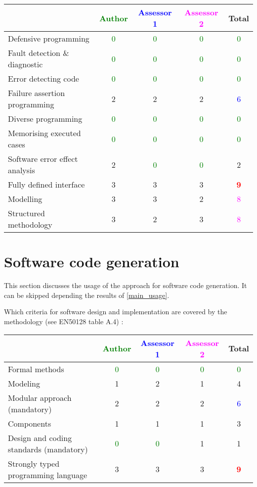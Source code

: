 \begin{tabular}{|l | c | c | c | c|}
\hline
& \textcolor{green}{Author} & \textcolor{blue}{Assessor 1} & \textcolor{magenta}{Assessor 2} & Total \\
\hline
Defensive programming & \textcolor{green}{0} & \textcolor{green}{0} & \textcolor{green}{0} & \textcolor{green}{0} \\
\hline
Fault detection \& diagnostic & \textcolor{green}{0} & \textcolor{green}{0} & \textcolor{green}{0} & \textcolor{green}{0} \\
\hline
Error detecting code & \textcolor{green}{0} & \textcolor{green}{0} & \textcolor{green}{0} & \textcolor{green}{0} \\
\hline
Failure assertion programming & 2    & 2    & 2    & \textcolor{blue}{6} \\
\hline
Diverse programming & \textcolor{green}{0} & \textcolor{green}{0} & \textcolor{green}{0} & \textcolor{green}{0} \\
\hline
Memorising executed cases & \textcolor{green}{0} & \textcolor{green}{0} & \textcolor{green}{0} & \textcolor{green}{0} \\
\hline
Software error effect analysis & 2    & \textcolor{green}{0} & \textcolor{green}{0} & 2    \\
\hline
Fully defined interface & 3    & 3    & 3    & \textcolor{red}{\textbf{9}} \\
\hline
Modelling & 3    & 3    & 2    & \textcolor{magenta}{8} \\
\hline
Structured methodology & 3    & 2    & 3    & \textcolor{magenta}{8} \\
\hline
\end{tabular}

\section{Software code generation}
This section discusses the usage of the approach for software code generation.
It can be skipped depending the results of \ref{main_usage}.

Which criteria for software design and implementation are covered by the methodology
(see EN50128 table A.4) :

\begin{tabular}{|l | c | c | c | c|}
\hline
& \textcolor{green}{Author} & \textcolor{blue}{Assessor 1} & \textcolor{magenta}{Assessor 2} & Total \\
\hline
Formal methods & \textcolor{green}{0} & \textcolor{green}{0} & \textcolor{green}{0} & \textcolor{green}{0} \\
\hline
Modeling & 1    & 2    & 1    & 4    \\
\hline
Modular approach (mandatory) & 2    & 2    & 2    & \textcolor{blue}{6} \\
\hline
Components & 1    & 1    & 1    & 3    \\
\hline
Design and coding standards (mandatory) & \textcolor{green}{0} & \textcolor{green}{0} & 1    & 1    \\
\hline
Strongly typed programming language & 3    & 3    & 3    & \textcolor{red}{\textbf{9}} \\
\hline
\end{tabular}

